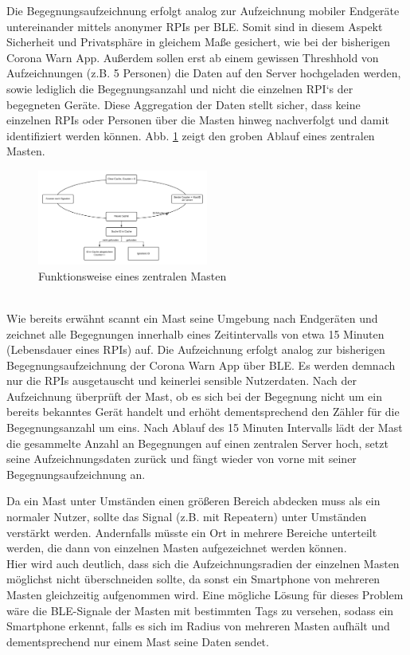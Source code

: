 \documentclass[conference,compsoc]{IEEEtran}
\begin{document}
Die Begegnungsaufzeichnung erfolgt analog zur Aufzeichnung mobiler Endgeräte untereinander mittels anonymer RPIs per BLE. 
Somit sind in diesem Aspekt Sicherheit und Privatsphäre in gleichem Maße gesichert, wie bei der bisherigen Corona Warn App. 
Außerdem sollen erst ab einem gewissen Threshhold von Aufzeichnungen (z.B. 5 Personen) die Daten auf den Server hochgeladen werden, sowie lediglich die Begegnungsanzahl und nicht die einzelnen RPI‘s der begegneten Geräte. 
Diese Aggregation der Daten stellt sicher, dass keine einzelnen RPIs oder Personen über die Masten hinweg nachverfolgt und damit identifiziert werden können. 
Abb. \ref{mast_func} zeigt den groben Ablauf eines zentralen Masten. \\ 
\begin{figure}[h]
	\centering
	\includegraphics[width=0.5\textwidth]{"Mast_functionality"}
	\caption{Funktionsweise eines zentralen Masten}
	\label{mast_func}
\end{figure}
\\
Wie bereits erwähnt scannt ein Mast seine Umgebung nach Endgeräten und zeichnet alle Begegnungen innerhalb eines Zeitintervalls von etwa 15 Minuten (Lebensdauer eines RPIs) auf. 
Die Aufzeichnung erfolgt analog zur bisherigen Begegnungsaufzeichnung der Corona Warn App über BLE. 
Es werden demnach nur die RPIs ausgetauscht und keinerlei sensible Nutzerdaten. 
Nach der Aufzeichnung überprüft der Mast, ob es sich bei der Begegnung nicht um ein bereits bekanntes Gerät handelt und erhöht dementsprechend den Zähler für die Begegnungsanzahl um eins. 
Nach Ablauf des 15 Minuten Intervalls lädt der Mast die gesammelte Anzahl an Begegnungen auf einen zentralen Server hoch, setzt seine Aufzeichnungsdaten zurück und  fängt wieder von vorne mit seiner Begegnungsaufzeichnung an. 

Da ein Mast unter Umständen einen größeren Bereich abdecken muss als ein normaler Nutzer, sollte das Signal (z.B. mit Repeatern) unter Umständen verstärkt werden.
Andernfalls müsste ein Ort in mehrere Bereiche unterteilt werden, die dann von einzelnen Masten aufgezeichnet werden können. \\
Hier wird auch deutlich, dass sich die Aufzeichnungsradien der einzelnen Masten möglichst nicht überschneiden sollte, da sonst ein Smartphone von mehreren Masten gleichzeitig aufgenommen wird.
Eine mögliche Lösung für dieses Problem wäre die BLE-Signale der Masten mit bestimmten Tags zu versehen, sodass ein Smartphone erkennt, falls es sich im Radius von mehreren Masten aufhält und dementsprechend nur einem Mast seine Daten sendet. 
\end{document}
